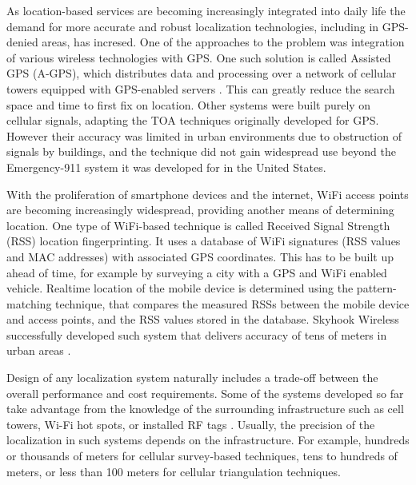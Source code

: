 As location-based services are becoming increasingly integrated into daily life  the demand for more accurate and robust localization technologies, including in GPS-denied areas, has incresed. One of the approaches to the problem was integration of various wireless technologies with GPS. One such solution is called Assisted GPS (A-GPS), which distributes data and processing over a network of cellular towers equipped with GPS-enabled servers \cite{AGPS}. This can greatly reduce the search space and time to first fix on location. Other systems were built purely on cellular signals, adapting the TOA techniques originally developed for GPS. However their accuracy was limited in urban environments due to obstruction of signals by buildings, and the technique did not gain widespread use beyond the Emergency-911 system it was developed for in the United States.


With the proliferation of smartphone devices and the internet, WiFi access points are becoming increasingly widespread, providing another means of determining location. One type of WiFi-based technique is called Received Signal Strength (RSS) location fingerprinting. It uses a database of WiFi signatures (RSS values and MAC addresses) with associated GPS coordinates. This has to be built up ahead of time, for example by surveying a city with a GPS and WiFi enabled vehicle. 
Realtime location of the mobile device is determined using the pattern-matching technique, that compares the measured RSSs between the mobile device and access points, and the RSS values stored in the database. Skyhook Wireless successfully developed such system that delivers accuracy of tens of meters in urban areas \cite{Skyhook}. 

Design of any localization system naturally includes a trade-off between the overall performance and cost requirements. Some of the systems developed so far take advantage from the knowledge of the surrounding infrastructure such as
cell towers, Wi-Fi hot spots, or installed RF tags \cite{GeoLoc}. Usually, the precision of the localization in such systems depends on the infrastructure. For example,  hundreds or thousands of meters for cellular survey-based techniques, tens to hundreds of meters, or less than 100 meters for cellular triangulation techniques.


